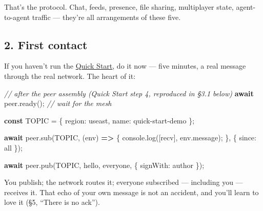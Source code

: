 \documentclass[
  nobib]{tufte-handout}
\newenvironment{Shaded}{}{}
\newcommand{\AttributeTok}[1]{\textcolor[rgb]{0.49,0.56,0.16}{#1}}
\newcommand{\BuiltInTok}[1]{\textcolor[rgb]{0.00,0.50,0.00}{#1}}
\newcommand{\CommentTok}[1]{\textcolor[rgb]{0.38,0.63,0.69}{\textit{#1}}}
\newcommand{\ControlFlowTok}[1]{\textcolor[rgb]{0.00,0.44,0.13}{\textbf{#1}}}
\newcommand{\DataTypeTok}[1]{\textcolor[rgb]{0.56,0.13,0.00}{#1}}
\newcommand{\FunctionTok}[1]{\textcolor[rgb]{0.02,0.16,0.49}{#1}}
\newcommand{\KeywordTok}[1]{\textcolor[rgb]{0.00,0.44,0.13}{\textbf{#1}}}
\newcommand{\NormalTok}[1]{#1}
\newcommand{\OperatorTok}[1]{\textcolor[rgb]{0.40,0.40,0.40}{#1}}
\newcommand{\StringTok}[1]{\textcolor[rgb]{0.25,0.44,0.63}{#1}}
\begin{document}
That's the protocol. Chat, feeds, presence, file sharing, multiplayer
state, agent-to-agent traffic --- they're all arrangements of these
five.

\subsection{2. First contact}\label{first-contact}

If you haven't run the \href{Quick-Start-v4.11.2.md}{Quick Start}, do it
now --- five minutes, a real message through the real network. The heart
of it:

\begin{Shaded}
\begin{Highlighting}[]
\CommentTok{// after the peer assembly (Quick Start step 4, reproduced in §3.1 below)}
\ControlFlowTok{await}\NormalTok{ peer}\OperatorTok{.}\FunctionTok{ready}\NormalTok{()}\OperatorTok{;}                                     \CommentTok{// wait for the mesh}

\KeywordTok{const}\NormalTok{ TOPIC }\OperatorTok{=}\NormalTok{ \{ }\DataTypeTok{region}\OperatorTok{:} \StringTok{\textquotesingle{}useast\textquotesingle{}}\OperatorTok{,} \DataTypeTok{name}\OperatorTok{:} \StringTok{\textquotesingle{}quick{-}start{-}demo\textquotesingle{}}\NormalTok{ \}}\OperatorTok{;}

\ControlFlowTok{await}\NormalTok{ peer}\OperatorTok{.}\FunctionTok{sub}\NormalTok{(TOPIC}\OperatorTok{,}\NormalTok{ (env) }\KeywordTok{=\textgreater{}}\NormalTok{ \{}
  \BuiltInTok{console}\OperatorTok{.}\FunctionTok{log}\NormalTok{(}\StringTok{\textquotesingle{}[recv]\textquotesingle{}}\OperatorTok{,}\NormalTok{ env}\OperatorTok{.}\AttributeTok{message}\NormalTok{)}\OperatorTok{;}
\NormalTok{\}}\OperatorTok{,}\NormalTok{ \{ }\DataTypeTok{since}\OperatorTok{:} \StringTok{\textquotesingle{}all\textquotesingle{}}\NormalTok{ \})}\OperatorTok{;}

\ControlFlowTok{await}\NormalTok{ peer}\OperatorTok{.}\FunctionTok{pub}\NormalTok{(TOPIC}\OperatorTok{,} \StringTok{\textquotesingle{}hello, everyone\textquotesingle{}}\OperatorTok{,}\NormalTok{ \{ }\DataTypeTok{signWith}\OperatorTok{:}\NormalTok{ author \})}\OperatorTok{;}
\end{Highlighting}
\end{Shaded}

You publish; the network routes it; everyone subscribed --- including
you --- receives it. That echo of your own message is not an accident,
and you'll learn to love it (§5, ``There is no ack'').
\end{document}
